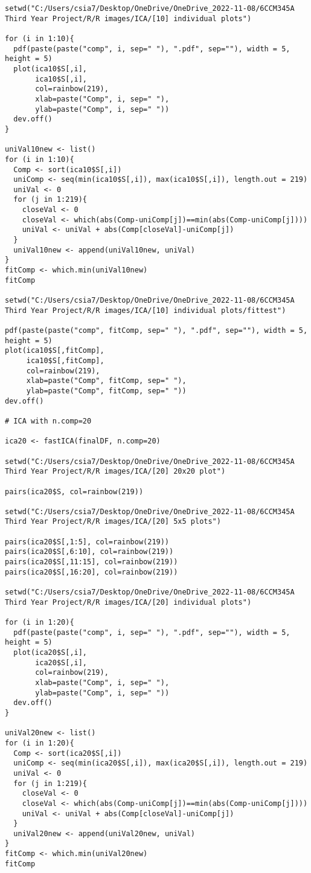 \begin{verbatim}
setwd("C:/Users/csia7/Desktop/OneDrive/OneDrive_2022-11-08/6CCM345A Third Year Project/R/R images/ICA/[10] individual plots")

for (i in 1:10){
  pdf(paste(paste("comp", i, sep=" "), ".pdf", sep=""), width = 5, height = 5) 
  plot(ica10$S[,i],
       ica10$S[,i], 
       col=rainbow(219), 
       xlab=paste("Comp", i, sep=" "), 
       ylab=paste("Comp", i, sep=" "))
  dev.off()
}

uniVal10new <- list()
for (i in 1:10){
  Comp <- sort(ica10$S[,i])
  uniComp <- seq(min(ica10$S[,i]), max(ica10$S[,i]), length.out = 219)
  uniVal <- 0
  for (j in 1:219){
    closeVal <- 0
    closeVal <- which(abs(Comp-uniComp[j])==min(abs(Comp-uniComp[j])))
    uniVal <- uniVal + abs(Comp[closeVal]-uniComp[j])
  }
  uniVal10new <- append(uniVal10new, uniVal)
}
fitComp <- which.min(uniVal10new)
fitComp

setwd("C:/Users/csia7/Desktop/OneDrive/OneDrive_2022-11-08/6CCM345A Third Year Project/R/R images/ICA/[10] individual plots/fittest")

pdf(paste(paste("comp", fitComp, sep=" "), ".pdf", sep=""), width = 5, height = 5) 
plot(ica10$S[,fitComp],
     ica10$S[,fitComp], 
     col=rainbow(219), 
     xlab=paste("Comp", fitComp, sep=" "), 
     ylab=paste("Comp", fitComp, sep=" "))
dev.off()

# ICA with n.comp=20

ica20 <- fastICA(finalDF, n.comp=20)

setwd("C:/Users/csia7/Desktop/OneDrive/OneDrive_2022-11-08/6CCM345A Third Year Project/R/R images/ICA/[20] 20x20 plot")

pairs(ica20$S, col=rainbow(219))

setwd("C:/Users/csia7/Desktop/OneDrive/OneDrive_2022-11-08/6CCM345A Third Year Project/R/R images/ICA/[20] 5x5 plots")

pairs(ica20$S[,1:5], col=rainbow(219))
pairs(ica20$S[,6:10], col=rainbow(219))
pairs(ica20$S[,11:15], col=rainbow(219))
pairs(ica20$S[,16:20], col=rainbow(219))

setwd("C:/Users/csia7/Desktop/OneDrive/OneDrive_2022-11-08/6CCM345A Third Year Project/R/R images/ICA/[20] individual plots")

for (i in 1:20){
  pdf(paste(paste("comp", i, sep=" "), ".pdf", sep=""), width = 5, height = 5) 
  plot(ica20$S[,i],
       ica20$S[,i], 
       col=rainbow(219), 
       xlab=paste("Comp", i, sep=" "), 
       ylab=paste("Comp", i, sep=" "))
  dev.off()
}

uniVal20new <- list()
for (i in 1:20){
  Comp <- sort(ica20$S[,i])
  uniComp <- seq(min(ica20$S[,i]), max(ica20$S[,i]), length.out = 219)
  uniVal <- 0
  for (j in 1:219){
    closeVal <- 0
    closeVal <- which(abs(Comp-uniComp[j])==min(abs(Comp-uniComp[j])))
    uniVal <- uniVal + abs(Comp[closeVal]-uniComp[j])
  }
  uniVal20new <- append(uniVal20new, uniVal)
}
fitComp <- which.min(uniVal20new)
fitComp


\end{verbatim}
